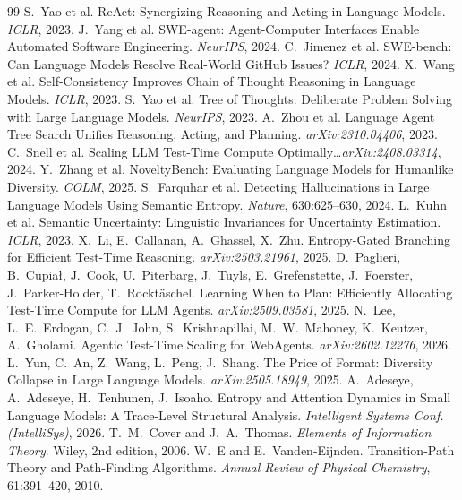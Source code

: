 \documentclass[11pt]{article}
\begin{document}
\begin{thebibliography}{99}
\small
{} S.~Yao et al. ReAct: Synergizing Reasoning and Acting in Language Models. \emph{ICLR}, 2023.
 J.~Yang et al. SWE-agent: Agent-Computer Interfaces Enable Automated Software Engineering. \emph{NeurIPS}, 2024.
 C.~Jimenez et al. SWE-bench: Can Language Models Resolve Real-World GitHub Issues? \emph{ICLR}, 2024.
 X.~Wang et al. Self-Consistency Improves Chain of Thought Reasoning in Language Models. \emph{ICLR}, 2023.
 S.~Yao et al. Tree of Thoughts: Deliberate Problem Solving with Large Language Models. \emph{NeurIPS}, 2023.
 A.~Zhou et al. Language Agent Tree Search Unifies Reasoning, Acting, and Planning. \emph{arXiv:2310.04406}, 2023.
 C.~Snell et al. Scaling LLM Test-Time Compute Optimally\dots \emph{arXiv:2408.03314}, 2024.
 Y.~Zhang et al. NoveltyBench: Evaluating Language Models for Humanlike Diversity. \emph{COLM}, 2025.
 S.~Farquhar et al. Detecting Hallucinations in Large Language Models Using Semantic Entropy. \emph{Nature}, 630:625--630, 2024.
 L.~Kuhn et al. Semantic Uncertainty: Linguistic Invariances for Uncertainty Estimation. \emph{ICLR}, 2023.
 X.~Li, E.~Callanan, A.~Ghassel, X.~Zhu. Entropy-Gated Branching for Efficient Test-Time Reasoning. \emph{arXiv:2503.21961}, 2025.
 D.~Paglieri, B.~Cupia\l{}, J.~Cook, U.~Piterbarg, J.~Tuyls, E.~Grefenstette, J.~Foerster, J.~Parker-Holder, T.~Rockt\"aschel. Learning When to Plan: Efficiently Allocating Test-Time Compute for LLM Agents. \emph{arXiv:2509.03581}, 2025.
 N.~Lee, L.~E.~Erdogan, C.~J.~John, S.~Krishnapillai, M.~W.~Mahoney, K.~Keutzer, A.~Gholami. Agentic Test-Time Scaling for WebAgents. \emph{arXiv:2602.12276}, 2026.
 L.~Yun, C.~An, Z.~Wang, L.~Peng, J.~Shang. The Price of Format: Diversity Collapse in Large Language Models. \emph{arXiv:2505.18949}, 2025.
 A.~Adeseye, A.~Adeseye, H.~Tenhunen, J.~Isoaho. Entropy and Attention Dynamics in Small Language Models: A Trace-Level Structural Analysis. \emph{Intelligent Systems Conf. (IntelliSys)}, 2026.
 T.~M.~Cover and J.~A.~Thomas. \emph{Elements of Information Theory}. Wiley, 2nd edition, 2006.
 W.~E and E.~Vanden-Eijnden. Transition-Path Theory and Path-Finding Algorithms. \emph{Annual Review of Physical Chemistry}, 61:391--420, 2010.

\end{thebibliography}
\end{document}
